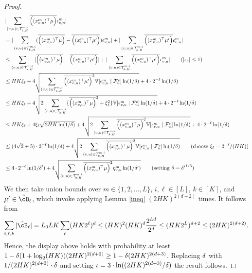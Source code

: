 \begin{proof}
  \begin{align*}
    &|\sum_{(v,u)\in \mathcal{T}_{k,H}^{m,i}}  \clip{(x_{v,u}^m)^\T \mu } \eps_{v,u}^{m}|
    \\&=   |\sum_{(v,u)\in \mathcal{T}_{k,H}^{m,i}} (\clip{(x_{v,u}^m)^\T \mu} - \clip{(x_{v,u}^m)^\T\mu'}) \eps_{v,u}^m| + |\sum_{(v,u)\in \mathcal{T}_{k,H}^{m,i}} \clip{(x_{v,u}^m)^\T\mu'} \eps_{v,u}^m| 
    \\&\le \sum_{(v,u)\in \mathcal{T}_{k,H}^{m,i}} |\clip{(x_{v,u}^m)^\T\mu} - \clip{(x_{v,u}^m)^\T\mu'}| + |\sum_{(v,u)\in \mathcal{T}_{k,H}^{m,i}} \clip{(x_{v,u}^m)^\T\mu'} \eps_{v,u}^m| \tag{$|\eps_s|\le 1$}
    \\&\le HK\xi_\ell  + 4\sqrt{\sum_{(v,u)\in \mathcal{T}_{k,H}^{m,i}} \clip{(x_{v,u}^m)^\T\mu'}^2 \VV[\eps^m_{v,u} \mid \cF_{u}^v] \ln(1/\dt)} + 4\cd 2^{-\ell}\ln(1/\dt)
    \\&\le HK \xi_\ell + 4\sqrt{2\sum_{(v,u)\in \mathcal{T}_{k,H}^{m,i}} \{\clip{(x_{v,u}^m)^\T\mu}^2 +\xi_\ell^2\}\VV[\eps^m_{v,u} \mid \cF_{u}^v] \ln(1/\dt)} + 4\cd 2^{-\ell}\ln(1/\dt)
    \\&\le HK \xi_\ell +4\xi_\ell\sqrt{2HK\ln(1/\dt)}+ 4\sqrt{2\sum_{(v,u)\in \mathcal{T}_{k,H}^{m,i}} \clip{(x_{v,u}^m)^\T\mu}^2 \VV[\eps^m_{v,u} \mid \cF_{u}^v] \ln(1/\dt)} + 4\cd 2^{-\ell}\ln(1/\dt)
    \\&\le (4\sqrt{2}+5) \cd 2^{-\ell}  \ln(1/\dt) + 4\sqrt{2\sum_{(v,u)\in \mathcal{T}_{k,H}^{m,i}} \clip{({x_{v,u}^{m}})^\T\mu}^2\VV[\eps^m_{v,u} \mid \cF_{u}^v]\ln(1/\dt)}  \tag{choose $\xi_\ell = 2^{-\ell}/(HK)$}
        \\&\le 4 \cd 2^{-\ell}  \ln(1/\dt') + 4\sqrt{\sum_{(v,u)\in \mathcal{T}_{k,H}^{m,i}} \clip{({x_{v,u}^{m}})^\T\mu}^2\eta_{v,u}^m\ln(1/\dt')}  \tag{setting $\dt = {\dt'}^{1/3}$}
    \end{align*}
We then take union bounds over $m \in \{1,2,...,L\}$, $i,\ell \in [L]$, $k\in[K]$, and $\mu' \in \hcB_\ell$, which invoke applying Lemma \ref{ineq} $(2HK)^{2(d+2)}$ times. It follows from
\begin{equation*}
    \sum_{i,\ell,k} |\hcB_\ell| = L_0 L K \sum_{\ell} (HK2^\ell)^d \le (HK)^2 (HK)^d\frac{2^{Ld}}{2^d} \le (HK2^{L})^{d+2} \le (2HK)^{2(d+2)}.
\end{equation*}
Hence, the display above holds with probability at least $1-{{\delta}}(1+\log_2(HK))(2HK)^{2(d+2)}\ge 1-{\delta} (2HK)^{2(d+3)}$. Replacing ${\delta}$ with $ 1/(2HK)^{2(d+3)}\cdot {\ensuremath{\delta}}$ and setting $\iota=3\cdot\ln((2HK)^{2(d+3)}/{\delta})$ the result follows.

\end{proof}

